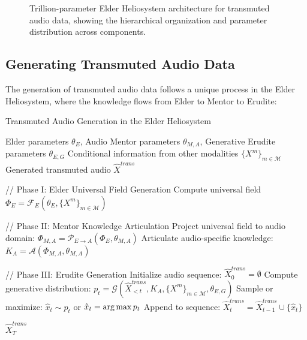 \begin{figure}[h]
\caption{Trillion-parameter Elder Heliosystem architecture for transmuted audio data, showing the hierarchical organization and parameter distribution across components.}
\label{fig:trillion_parameter_architecture}
\end{figure}

\subsection{Generating Transmuted Audio Data}

The generation of transmuted audio data follows a unique process in the Elder Heliosystem, where the knowledge flows from Elder to Mentor to Erudite:

\begin{algorithm}
\caption{Transmuted Audio Generation in the Elder Heliosystem}
\begin{algorithmic}[1]
\Require Elder parameters $\theta_E$, Audio Mentor parameters $\theta_{M,A}$, Generative Erudite parameters $\theta_{E,G}$
\Require Conditional information from other modalities $\{X^m\}_{m \in \mathcal{M}}$
\Ensure Generated transmuted audio $\hat{X}^{trans}$

\State // Phase I: Elder Universal Field Generation
\State Compute universal field $\Phi_E = \mathcal{F}_E(\theta_E, \{X^m\}_{m \in \mathcal{M}})$

\State // Phase II: Mentor Knowledge Articulation
\State Project universal field to audio domain: $\Phi_{M,A} = \mathcal{P}_{E \to A}(\Phi_E, \theta_{M,A})$
\State Articulate audio-specific knowledge: $K_A = \mathcal{A}(\Phi_{M,A}, \theta_{M,A})$

\State // Phase III: Erudite Generation
\State Initialize audio sequence: $\hat{X}^{trans}_0 = \emptyset$
    \State Compute generative distribution: $p_t = \mathcal{G}(\hat{X}^{trans}_{<t}, K_A, \{X^m\}_{m \in \mathcal{M}}, \theta_{E,G})$
    \State Sample or maximize: $\hat{x}_t \sim p_t$ or $\hat{x}_t = \mathop{\mathrm{arg\,max}} p_t$
    \State Append to sequence: $\hat{X}^{trans}_t = \hat{X}^{trans}_{t-1} \cup \{\hat{x}_t\}$
\EndFor

\State \Return $\hat{X}^{trans}_T$
\end{algorithmic}
\end{algorithm}


